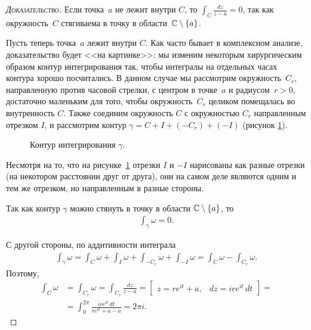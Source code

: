 \documentclass[../complex-analysis.tex]{subfiles}
\begin{document}
\begin{proof}[\normalfont\textsc{Доказательство}]
 Если точка~$a$ не лежит внутри $C$, то $ \int_{C} \frac{dz}{z-a} = 0 $, так как окружность~$ C $ стягиваема в точку в области~$ \mathbb{C}\setminus \left\{ a \right\} $.

 Пусть теперь точка~$a$  лежит внутри $C$. Как часто бывает в комплексном анализе, доказательство будет <<на картинке>>: мы изменим некоторым хирургическим образом контур интегрирования так, чтобы интегралы на отдельных часах контура хорошо посчитались. В данном случае мы рассмотрим окружность~$ C_r $, направленную против часовой стрелки, с центром в точке~$ a $ и радиусом~$ r > 0 $, достаточно маленьким для того, чтобы окружность~$ C_r $ целиком помещалась во внутренность $ C $. Также соединим окружность $ C $ с окружностью $ C_r $ направленным отрезком $ I $, и рассмотрим контур $ \gamma = C + I + (-C_r) + (-I)$ (рисунок \ref{fig:gamma_with_tilde}).

 \begin{figure}[ht]
  \centering
  \caption{Контур интегрирования $ \gamma $.}
  \label{fig:gamma_with_tilde}
 \end{figure}

 Несмотря на то, что на рисунке~\ref{fig:gamma_with_tilde} отрезки $ I $ и $ -I $ нарисованы как разные отрезки (на некотором расстоянии друг от друга), они на самом деле являются одним и тем же отрезком, но направленным в разные стороны.

 Так как контур $ \gamma $ можно стянуть в точку в области $ \mathbb{C}\setminus \left\{ a \right\} $, то
 \begin{align*}
  \int_{\gamma}  \omega = 0.
 \end{align*}

 С другой стороны, по аддитивности интеграла
 \begin{align*}
  \int_{\gamma} \omega = \int_{C} \omega + \int_{I} \omega + \int_{-C_r} \omega + \int_{-I} \omega = \int_{C} \omega - \int_{C_r} \omega.   
 \end{align*} Поэтому,
 \begin{align*}
  \int_{C} \omega &= \int_{C_r} \omega = \int_{C_r} \frac{dz}{z-a} = \begin{bmatrix}
   z = re^{it}+a, & dz = ire^{it}\,dt
  \end{bmatrix}=\\
  &= \int_{0}^{2\pi} \frac{ir e^{it}\,dt}{r e^{it} + a - a} = 2\pi i.
 \end{align*}
\end{proof}
\end{document}
